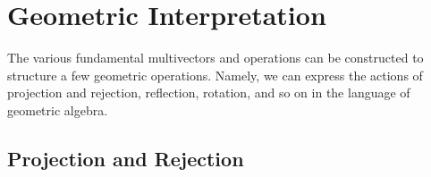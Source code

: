\documentclass{article}
\begin{document}
\section{Geometric Interpretation}
The various fundamental multivectors and operations can be constructed to structure a few geometric operations. Namely, we can express the actions of projection and rejection, reflection, rotation, and so on in the language of geometric algebra.

\subsection{Projection and Rejection}
\end{document}
